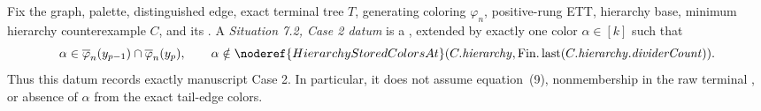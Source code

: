 \begin{definition}
Fix the graph, palette, distinguished edge, exact terminal tree \(T\),
generating coloring \(\varphi_n\), positive-rung ETT, hierarchy base,
minimum hierarchy counterexample \(C\), and its
.  A
\emph{Situation 7.2, Case 2 datum} is a
, extended by exactly one color
\(\alpha\in[k]\) such that
\[
 \alpha\in\overline\varphi_n(y_{p-1})\cap
              \overline\varphi_n(y_p),
 \qquad
 \alpha\notin
 \noderef{HierarchyStoredColorsAt}
   (C.\mathit{hierarchy},\operatorname{Fin.last}
      (C.\mathit{hierarchy}.\mathit{dividerCount})).
\]
Thus this datum records exactly manuscript Case 2.  In particular, it does
not assume equation~(9), nonmembership in the raw terminal
, or absence of \(\alpha\) from the exact
tail-edge colors.
\end{definition}
